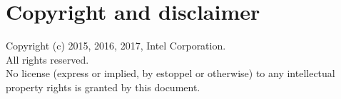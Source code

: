 \documentclass[11pt]{article}
\begin{document}
\section{Copyright and disclaimer}
Copyright (c) 2015, 2016, 2017, Intel Corporation.
\\
All rights reserved.
\\
No license (express or implied, by estoppel or otherwise) to any
intellectual property rights is granted by this document.

%
%
%
\end{document}
